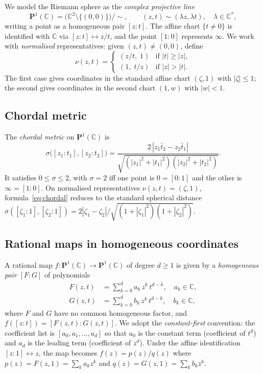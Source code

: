 \documentclass[12pt]{article}
\theoremstyle{definition}
\newcommand{\C}{\mathbb{C}}
\newcommand{\Pone}{\mathbf{P}^1(\C)}
\newcommand{\hpair}{[F:G]}
\begin{document}
We model the Riemann sphere as the \emph{complex projective line}
\[
  \Pone = \bigl(\C^2\setminus\{(0,0)\}\bigr)\big/{\sim},
  \qquad
  (z,t)\sim(\lambda z,\lambda t),\quad \lambda\in\C^*,
\]
writing a point as a homogeneous pair $[z:t]$.  The affine chart
$\{t\neq 0\}$ is identified with $\C$ via $[z:t]\mapsto z/t$, and the
point $[1:0]$ represents $\infty$.  We work with \emph{normalised}
representatives: given $(z,t)\neq(0,0)$, define
\begin{equation}\label{eq:normalize}
  \nu(z,t) =
  \begin{cases}
    (z/t,\;1)   & \text{if }|t|\geq|z|,\\[2pt]
    (1,\;t/z)   & \text{if }|z|>|t|.
  \end{cases}
\end{equation}
The first case gives coordinates in the standard affine chart
$(\zeta,1)$ with $|\zeta|\leq 1$; the second gives coordinates in the
second chart $(1,w)$ with $|w|<1$.

\subsection{Chordal metric}

The \emph{chordal metric} on $\Pone$ is
\begin{equation}\label{eq:chordal}
  \sigma\bigl([z_1:t_1],[z_2:t_2]\bigr)
  = \frac{2\,|z_1\bar t_2 - z_2\bar t_1|}%
         {\sqrt{(|z_1|^2+|t_1|^2)(|z_2|^2+|t_2|^2)}}.
\end{equation}
It satisfies $0\leq\sigma\leq 2$, with $\sigma=2$ iff one point is $0=[0:1]$
and the other is $\infty=[1:0]$.  On normalised representatives
$\nu(z,t)=(\zeta,1)$, formula~\eqref{eq:chordal} reduces to the standard
spherical distance
$\sigma([\zeta_1:1],[\zeta_2:1]) = 2|\zeta_1-\zeta_2|/\sqrt{(1+|\zeta_1|^2)(1+|\zeta_2|^2)}$.

\subsection{Rational maps in homogeneous coordinates}

A rational map $f\colon\Pone\to\Pone$ of degree $d\geq 1$ is given by a
\emph{homogeneous pair} $\hpair$ of polynomials
\begin{align}
  F(z,t) &= \sum_{k=0}^d a_k\, z^k\, t^{d-k},\quad
             a_k\in\C,
  \label{eq:Fpoly}\\
  G(z,t) &= \sum_{k=0}^d b_k\, z^k\, t^{d-k},\quad
             b_k\in\C,
  \label{eq:Gpoly}
\end{align}
where $F$ and $G$ have no common homogeneous factor, and
$f([z:t]) = [F(z,t):G(z,t)]$.  We adopt the \emph{constant-first}
convention: the coefficient list is $[a_0,a_1,\ldots,a_d]$ so that
$a_0$ is the constant term (coefficient of $t^d$) and $a_d$ is the
leading term (coefficient of $z^d$).  Under the affine identification
$[z:1]\leftrightarrow z$, the map becomes $f(z)=p(z)/q(z)$ where
$p(z)=F(z,1)=\sum_k a_k z^k$ and $q(z)=G(z,1)=\sum_k b_k z^k$.
\end{document}
